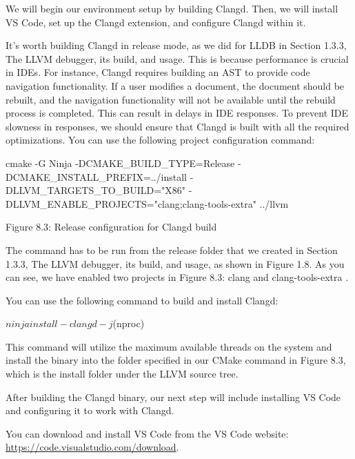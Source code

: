 We will begin our environment setup by building Clangd. Then, we will install VS Code, set up the Clangd extension, and configure Clangd within it.


It's worth building Clangd in release mode, as we did for LLDB in Section 1.3.3, The LLVM debugger, its build, and usage. This is because performance is crucial in IDEs. For instance, Clangd requires building an AST to provide code navigation functionality. If a user modifies a document, the document should be rebuilt, and the navigation functionality will not be available until the rebuild process is completed. This can result in delays in IDE responses. To prevent IDE slowness in responses, we should ensure that Clangd is built with all the required optimizations. You can use the following project configuration command:

\begin{shell}
cmake -G Ninja -DCMAKE_BUILD_TYPE=Release -DCMAKE_INSTALL_PREFIX=../install -DLLVM_TARGETS_TO_BUILD="X86" -DLLVM_ENABLE_PROJECTS="clang;clang-tools-extra" ../llvm
\end{shell}

\begin{center}
Figure 8.3: Release configuration for Clangd build
\end{center}

The command has to be run from the release folder that we created in Section 1.3.3, The LLVM debugger, its build, and usage, as shown in Figure 1.8. As you can see, we have enabled two projects in Figure 8.3: clang and clang-tools-extra .

You can use the following command to build and install Clangd:

\begin{shell}
$ ninja install-clangd -j $(nproc)
\end{shell}

This command will utilize the maximum available threads on the system and install the binary into the folder specified in our CMake command in Figure 8.3, which is the install folder under the LLVM source tree.

After building the Clangd binary, our next step will include installing VS Code and configuring it to work with Clangd.


You can download and install VS Code from the VS Code website: \url{https://code.visualstudio.com/download}.

